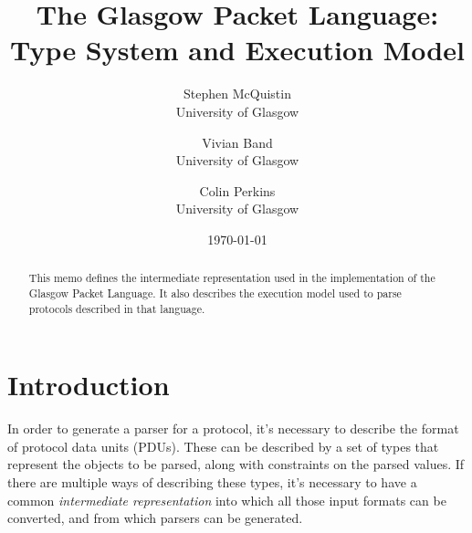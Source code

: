 \documentclass[10pt,twocolumn,a4paper]{article}
\begin{document}
\title{The Glasgow Packet Language: Type System and Execution Model}
\author{
  Stephen McQuistin\\University of Glasgow
\and
  Vivian Band\\University of Glasgow
\and
  Colin Perkins\\University of Glasgow
}
\date{\today}
\maketitle
\begin{abstract}

  This memo defines the intermediate representation used in the
  implementation of the Glasgow Packet Language. It also describes
  the execution model used to parse protocols described in that
  language.

\end{abstract}
\section{Introduction}





In order to generate a parser for a protocol, it's necessary to describe
the format of protocol data units (PDUs).
These can be described by a set of types that represent the objects to be
parsed, along with constraints on the parsed values.
If there are multiple ways of describing these types, it's necessary to
have a common \emph{intermediate representation} into which all those input
formats can be converted, and from which parsers can be generated.

\end{document}
